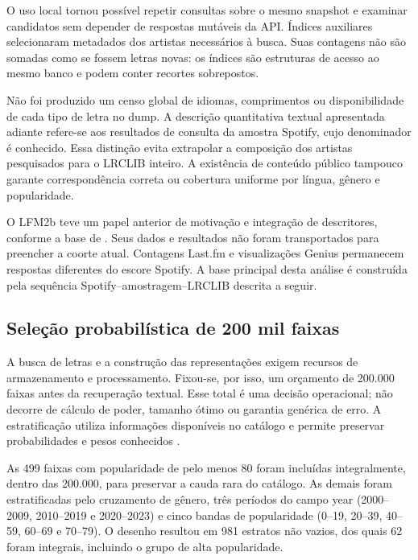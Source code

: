O uso local tornou possível repetir consultas sobre o mesmo snapshot e examinar candidatos sem depender de respostas mutáveis da API. Índices auxiliares selecionaram metadados dos artistas necessários à busca. Suas contagens não são somadas como se fossem letras novas: os índices são estruturas de acesso ao mesmo banco e podem conter recortes sobrepostos.

Não foi produzido um censo global de idiomas, comprimentos ou disponibilidade de cada tipo de letra no dump. A descrição quantitativa textual apresentada adiante refere-se aos resultados de consulta da amostra Spotify, cujo denominador é conhecido. Essa distinção evita extrapolar a composição dos artistas pesquisados para o LRCLIB inteiro. A existência de conteúdo público tampouco garante correspondência correta ou cobertura uniforme por língua, gênero e popularidade.

O LFM2b teve um papel anterior de motivação e integração de descritores, conforme a base de . Seus dados e resultados não foram transportados para preencher a coorte atual. Contagens Last.fm e visualizações Genius permanecem respostas diferentes do escore Spotify. A base principal desta análise é construída pela sequência Spotify--amostragem--LRCLIB descrita a seguir.

\FloatBarrier
\subsection{Seleção probabilística de 200 mil faixas}\label{subsec:amostragem}
A busca de letras e a construção das representações exigem recursos de armazenamento e processamento. Fixou-se, por isso, um orçamento de 200.000 faixas antes da recuperação textual. Esse total é uma decisão operacional; não decorre de cálculo de poder, tamanho ótimo ou garantia genérica de erro. A estratificação utiliza informações disponíveis no catálogo e permite preservar probabilidades e pesos conhecidos \cite{cochran1977,statcan2010}.

As 499 faixas com popularidade de pelo menos 80 foram incluídas integralmente, dentro das 200.000, para preservar a cauda rara do catálogo. As demais foram estratificadas pelo cruzamento de gênero, três períodos do campo year (2000--2009, 2010--2019 e 2020--2023) e cinco bandas de popularidade (0--19, 20--39, 40--59, 60--69 e 70--79). O desenho resultou em 981 estratos não vazios, dos quais 62 foram integrais, incluindo o grupo de alta popularidade.

